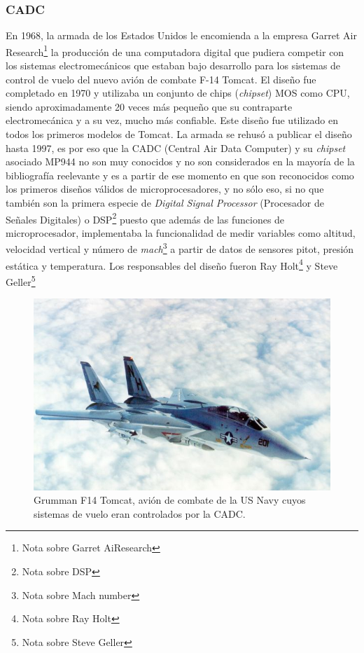 \subsubsection{CADC}

En 1968, la armada de los Estados Unidos le encomienda a la empresa Garret Air Research\footnote{Nota sobre Garret AiResearch} la producción de una computadora digital que pudiera competir con los sistemas electromecánicos que estaban bajo desarrollo para los sistemas de control de vuelo del nuevo avión de combate F-14 Tomcat. El diseño fue completado en 1970 y utilizaba un conjunto de chips (\emph{chipset}) MOS como CPU, siendo aproximadamente 20 veces más pequeño que su contraparte electromecánica y a su vez, mucho más confiable. Este diseño fue utilizado en todos los primeros modelos de Tomcat. La armada se rehusó a publicar el diseño hasta 1997, es por eso que la CADC (Central Air Data Computer) y su \emph{chipset} asociado MP944 no son muy conocidos y no son considerados en la mayoría de la bibliografía reelevante y es a partir de ese momento en que son reconocidos como los primeros diseños válidos de microprocesadores, y no sólo eso, si no que también son la primera especie de \emph{Digital Signal Processor} (Procesador de Señales Digitales) o DSP\footnote{Nota sobre DSP} puesto que además de las funciones de microprocesador, implementaba la funcionalidad de medir variables como altitud, velocidad vertical y número de \emph{mach}\footnote{Nota sobre Mach number} a partir de datos de sensores pitot, presión estática y temperatura. Los responsables del diseño fueron Ray Holt\footnote{Nota sobre Ray Holt} y Steve Geller\footnote{Nota sobre Steve Geller}

\begin{figure}
  \centering
  \includegraphics[scale=0.5]{./figures/C02-f14_tomcat}
  \captionsetup{justification=centering}
  \caption{Grumman F14 Tomcat, avión de combate de la US Navy cuyos sistemas de vuelo eran controlados por la CADC.}
  \label{fig:C02-f14_tomcat}
\end{figure}


